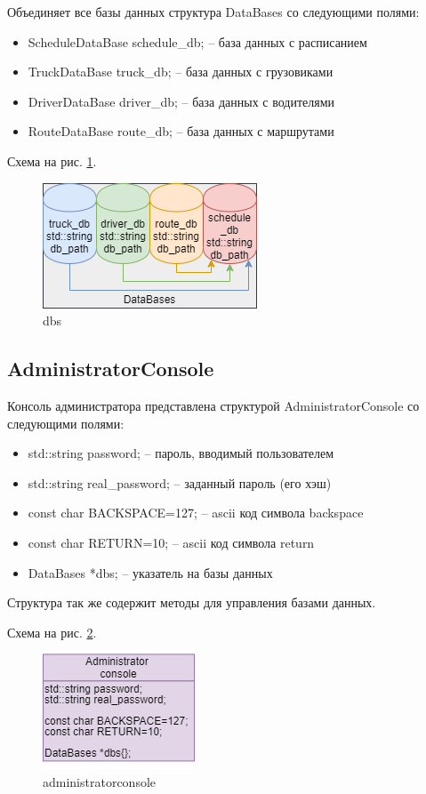 Объединяет все базы данных структура DataBases со следующими полями: 

\begin{itemize}
    \item ScheduleDataBase schedule\_db; -- база данных с расписанием
    \item TruckDataBase truck\_db; -- база данных с грузовиками
    \item DriverDataBase driver\_db; -- база данных с водителями
    \item RouteDataBase route\_db; -- база данных с маршрутами
\end{itemize}

Схема на рис. \ref{dbs}.

\begin{figure}[hpt!]
    \centering
    \includegraphics[width=0.4\linewidth]{photo/data_structures/dbs}
    \caption{dbs}
    \label{dbs}
\end{figure}

\subsection{AdministratorConsole}

Консоль администратора представлена структурой AdministratorConsole со следующими полями: 

\begin{itemize}
    \item std::string password; -- пароль, вводимый пользователем
    \item std::string real\_password; -- заданный пароль (его хэш)
    \item const char BACKSPACE=127; -- ascii код символа backspace
    \item const char RETURN=10; -- ascii код символа return
    \item DataBases *dbs{}; -- указатель на базы данных
\end{itemize}

Структура так же содержит методы для управления базами данных.

Схема на рис. \ref{administrator_console}.

\begin{figure}[hpt!]
    \centering
    \includegraphics[width=0.4\linewidth]{photo/data_structures/administrator_console}
    \caption{administratorconsole}
    \label{administrator_console}
\end{figure}

